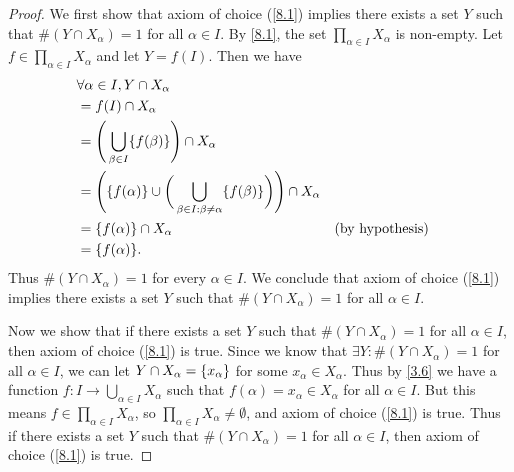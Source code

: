 \begin{proof}
  We first show that axiom of choice (\cref{8.1}) implies there exists a set \(Y\) such that \(\#(Y \cap X_{\alpha}) = 1\) for all \(\alpha \in I\).
  By \cref{8.1}, the set \(\prod_{\alpha \in I} X_{\alpha}\) is non-empty.
  Let \(f \in \prod_{\alpha \in I} X_{\alpha}\) and let \(Y = f(I)\).
  Then we have
  \begin{align*}
     & \forall \alpha \in I, Y \cap X_{\alpha}                                                                                                             \\
     & = f(I) \cap X_{\alpha}                                                                                                                              \\
     & = \Bigg(\bigcup_{\beta \in I} \set{f(\beta)}\Bigg) \cap X_{\alpha}                                                                                  \\
     & = \Bigg(\set{f(\alpha)} \cup \bigg(\bigcup_{\beta \in I : \beta \neq \alpha} \set{f(\beta)}\bigg)\Bigg) \cap X_{\alpha}                             \\
     & = \set{f(\alpha)} \cap X_{\alpha}                                                                                       &  & \text{(by hypothesis)} \\
     & = \set{f(\alpha)}.
  \end{align*}
  Thus \(\#(Y \cap X_{\alpha}) = 1\) for every \(\alpha \in I\).
  We conclude that axiom of choice (\cref{8.1}) implies there exists a set \(Y\) such that \(\#(Y \cap X_{\alpha}) = 1\) for all \(\alpha \in I\).

  Now we show that if there exists a set \(Y\) such that \(\#(Y \cap X_{\alpha}) = 1\) for all \(\alpha \in I\), then axiom of choice (\cref{8.1}) is true.
  Since we know that \(\exists Y : \#(Y \cap X_{\alpha}) = 1\) for all \(\alpha \in I\), we can let \(Y \cap X_{\alpha} = \left\lbrace x_{\alpha}\right\rbrace\) for some \(x_{\alpha} \in X_{\alpha}\).
  Thus by \cref{3.6} we have a function \(f : I \to \bigcup_{\alpha \in I} X_{\alpha}\) such that \(f(\alpha) = x_{\alpha} \in X_{\alpha}\) for all \(\alpha \in I\).
  But this means \(f \in \prod_{\alpha \in I} X_{\alpha}\), so \(\prod_{\alpha \in I} X_{\alpha} \neq \emptyset\), and axiom of choice (\cref{8.1}) is true.
  Thus if there exists a set \(Y\) such that \(\#(Y \cap X_{\alpha}) = 1\) for all \(\alpha \in I\), then axiom of choice (\cref{8.1}) is true.
\end{proof}

